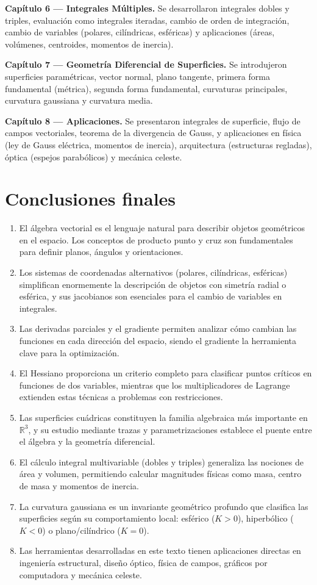 \documentclass[
]{book}
\begin{document}
\textbf{Capítulo 6 --- Integrales Múltiples.} Se desarrollaron integrales dobles y triples, evaluación como integrales iteradas, cambio de orden de integración, cambio de variables (polares, cilíndricas, esféricas) y aplicaciones (áreas, volúmenes, centroides, momentos de inercia).

\textbf{Capítulo 7 --- Geometría Diferencial de Superficies.} Se introdujeron superficies paramétricas, vector normal, plano tangente, primera forma fundamental (métrica), segunda forma fundamental, curvaturas principales, curvatura gaussiana y curvatura media.

\textbf{Capítulo 8 --- Aplicaciones.} Se presentaron integrales de superficie, flujo de campos vectoriales, teorema de la divergencia de Gauss, y aplicaciones en física (ley de Gauss eléctrica, momentos de inercia), arquitectura (estructuras regladas), óptica (espejos parabólicos) y mecánica celeste.

\section{Conclusiones finales}\label{conclusiones-finales}

\begin{enumerate}
\def\labelenumi{\arabic{enumi}.}
\item
  El álgebra vectorial es el lenguaje natural para describir objetos geométricos en el espacio. Los conceptos de producto punto y cruz son fundamentales para definir planos, ángulos y orientaciones.
\item
  Los sistemas de coordenadas alternativos (polares, cilíndricas, esféricas) simplifican enormemente la descripción de objetos con simetría radial o esférica, y sus jacobianos son esenciales para el cambio de variables en integrales.
\item
  Las derivadas parciales y el gradiente permiten analizar cómo cambian las funciones en cada dirección del espacio, siendo el gradiente la herramienta clave para la optimización.
\item
  El Hessiano proporciona un criterio completo para clasificar puntos críticos en funciones de dos variables, mientras que los multiplicadores de Lagrange extienden estas técnicas a problemas con restricciones.
\item
  Las superficies cuádricas constituyen la familia algebraica más importante en \(\mathbb{R}^3\), y su estudio mediante trazas y parametrizaciones establece el puente entre el álgebra y la geometría diferencial.
\item
  El cálculo integral multivariable (dobles y triples) generaliza las nociones de área y volumen, permitiendo calcular magnitudes físicas como masa, centro de masa y momentos de inercia.
\item
  La curvatura gaussiana es un invariante geométrico profundo que clasifica las superficies según su comportamiento local: esférico (\(K > 0\)), hiperbólico (\(K < 0\)) o plano/cilíndrico (\(K = 0\)).
\item
  Las herramientas desarrolladas en este texto tienen aplicaciones directas en ingeniería estructural, diseño óptico, física de campos, gráficos por computadora y mecánica celeste.
\end{enumerate}
\end{document}

